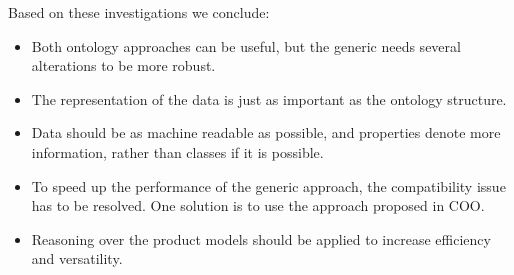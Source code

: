 \documentclass{llncs}
\begin{document}
Based on these investigations we conclude:
\begin{itemize}
 \item Both ontology approaches can be useful, but the generic needs several alterations to be more robust.
 \item The representation of the data is just as important as the ontology structure.
 \item Data should be as machine readable as possible, and properties denote more information, rather than classes if it is possible.
 \item To speed up the performance of the generic approach, the compatibility issue has to be resolved. One solution is to use the approach proposed in COO.
 \item Reasoning over the product models should be applied to increase efficiency and versatility.
\end{itemize}


%
%
%

\end{document}
